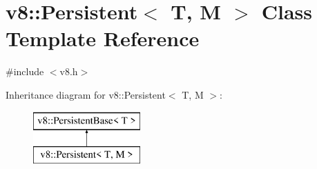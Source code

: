 \hypertarget{classv8_1_1_persistent}{}\section{v8\+:\+:Persistent$<$ T, M $>$ Class Template Reference}
\label{classv8_1_1_persistent}


{\ttfamily \#include $<$v8.\+h$>$}

Inheritance diagram for v8\+:\+:Persistent$<$ T, M $>$\+:\begin{figure}[H]
\begin{center}
\leavevmode
\includegraphics[height=2.000000cm]{classv8_1_1_persistent}
\end{center}
\end{figure}
